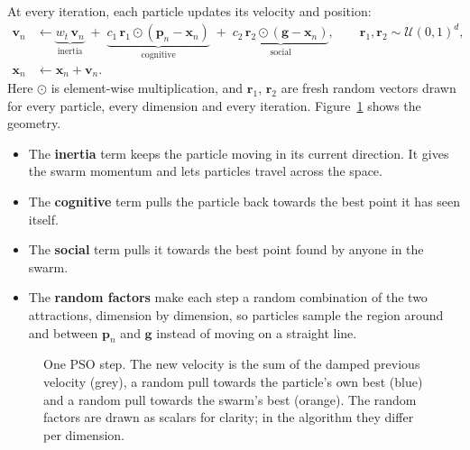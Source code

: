 \documentclass[11pt,a4paper]{article}
\begin{document}
At every iteration, each particle updates its velocity and position:
\begin{align}
\bm v_n &\leftarrow \underbrace{w_t\,\bm v_n}_{\text{inertia}}
\;+\; \underbrace{c_1\,\bm r_1 \odot (\bm p_n - \bm x_n)}_{\text{cognitive}}
\;+\; \underbrace{c_2\,\bm r_2 \odot (\bm g - \bm x_n)}_{\text{social}},
\qquad \bm r_1, \bm r_2 \sim \mathcal U(0,1)^d,
\label{eq:velocity}\\
\bm x_n &\leftarrow \bm x_n + \bm v_n.
\label{eq:position}
\end{align}
Here $\odot$ is element-wise multiplication, and $\bm r_1$, $\bm r_2$ are fresh random vectors drawn for
every particle, every dimension and every iteration. Figure~\ref{fig:velocity} shows the geometry.
\begin{itemize}
  \item The \textbf{inertia} term keeps the particle moving in its current direction. It gives the swarm
        momentum and lets particles travel across the space.
  \item The \textbf{cognitive} term pulls the particle back towards the best point it has seen itself.
  \item The \textbf{social} term pulls it towards the best point found by anyone in the swarm.
  \item The \textbf{random factors} make each step a random combination of the two attractions, dimension
        by dimension, so particles sample the region around and between $\bm p_n$ and $\bm g$ instead of
        moving on a straight line.
\end{itemize}

\begin{figure}[H]
\centering
{}
\caption{One PSO step. The new velocity is the sum of the damped previous velocity (grey), a random pull
towards the particle's own best (blue) and a random pull towards the swarm's best (orange). The random
factors are drawn as scalars for clarity; in the algorithm they differ per dimension.}
\label{fig:velocity}
\end{figure}
\end{document}
